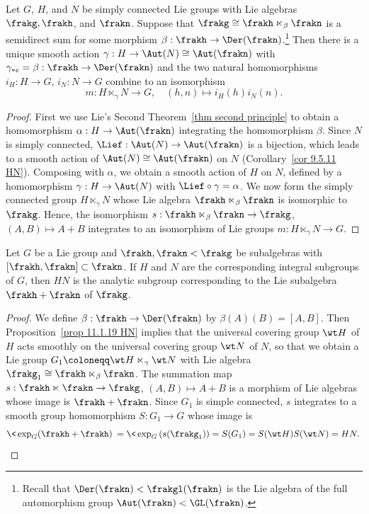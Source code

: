 \begin{prop}[{\cite[Prop.~11.1.19]{HN}}]\label{prop 11.1.19 HN}
    Let $G$, $H$, and $N$ be simply connected Lie groups with Lie algebras $\frakg,\frakh$, and $\frakn$. Suppose that $\frakg\cong\frakh\ltimes_\beta\frakn$ is a semidirect sum for some morphism $\beta:\frakh\to \Der(\frakn)$.\footnote{Recall that $\Der(\frakn)<\frakgl(\frakn)$ is the Lie algebra of the full automorphism group $\Aut(\frakn)<\GL(\frakn)$.} Then there is a unique smooth action $\gamma:H\to \Aut(N)\cong \Aut(\frakn)$ with $\gamma_{\ast e}=\beta:\frakh\to \Der(\frakn)$ and the two natural homomorphisms $i_H:H\to G$, $i_N:N\to G$ combine to an isomorphism 
    \[m:H\ltimes_\gamma N\to G,\quad (h,n)\mapsto i_H(h)i_N(n).\]
\end{prop}
\begin{proof}
    First we use Lie's Second Theorem~\ref{thm second principle} to obtain a homomorphism $\alpha:H\to \Aut(\frakn)$ integrating the homomorphism $\beta$. Since $N$ is simply connected, $\Lief:\Aut(N)\to \Aut(\frakn)$ is a bijection, which leads to a smooth action of $\Aut(N)\cong \Aut(\frakn)$ on $N$ (Corollary~\ref{cor 9.5.11 HN}). Composing with $\alpha$, we obtain a smooth action of $H$ on $N$, defined by a homomorphism $\gamma:H\to \Aut(N)$ with $\Lief\circ\gamma=\alpha$. We now form the simply connected group $H\ltimes_\gamma N$ whose Lie algebra $\frakh\ltimes_\beta\frakn$  is isomorphic to $\frakg$. Hence, the isomorphism $s:\frakh\ltimes_\beta\frakn\to \frakg$, $(A,B)\mapsto A+B$ integrates to an isomorphism of Lie groups $m:H\ltimes_\gamma N\to G$.
\end{proof}

\begin{cor}
    Let $G$ be a Lie group and $\frakh,\frakn<\frakg$ be subalgebras with $[\frakh,\frakn]\subset \frakn$. If $H$ and $N$ are the corresponding integral subgroups of $G$, then $HN$ is the analytic subgroup corresponding to the Lie subalgebra $\frakh+\frakn$ of $\frakg$.
\end{cor}
\begin{proof}
    We define $\beta:\frakh\to\Der(\frakn)$ by $\beta(A)(B)=[A,B]$. Then Proposition~\ref{prop 11.1.19 HN} implies that the universal covering group $\wt H$ of $H$ acts smoothly on the universal covering group $\wt N$ of $N$, so that we obtain a Lie group $G_1\coloneqq \wt H\ltimes_\gamma\wt N$ with Lie algebra $\frakg_1\cong \frakh\ltimes_\beta \frakn$. The summation map $s:\frakh\ltimes\frakn\to \frakg$, $(A,B)\mapsto A+B$ is a morphism of Lie algebras whose image is $\frakh+\frakn$. Since $G_1$ is simple connected, $s$ integrates to a smooth group homomorphism $S:G_1\to G$ whose image is 
    \[\<\exp_G(\frakh+\frakh)\> =\<\exp_G\left(s(\frakg_1)\right)=S(G_1)=S(\wt H)S(\wt N)=HN.\>\]
\end{proof}

